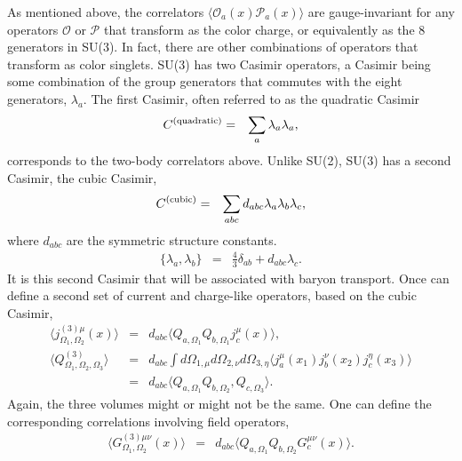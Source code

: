 \documentclass[aps, prc, 12pt, nofootinbib, showpacs, superscriptaddress, tightenlines, groupedaddress]{revtex4-2}
\begin{document}
As mentioned above, the correlators $\langle\mathcal{O}_a(x)\mathcal{P}_a(x)\rangle$ are gauge-invariant for any operators $\mathcal{O}$ or $\mathcal{P}$ that transform as the color charge, or equivalently as the 8 generators in SU(3). In fact, there are other combinations of operators that transform as color singlets. SU(3) has two Casimir operators, a Casimir being some combination of the group generators that commutes with the eight generators, $\lambda_a$. The first Casimir, often referred to as the quadratic Casimir
\begin{eqnarray}
C^{\rm(quadratic)}&=&\sum_a\lambda_a\lambda_a,
\end{eqnarray}
corresponds to the two-body correlators above. Unlike SU(2), SU(3) has a second Casimir, the cubic Casimir,
\begin{eqnarray}
C^{\rm(cubic)}&=&\sum_{abc}d_{abc}\lambda_a\lambda_b\lambda_c,
\end{eqnarray}
where $d_{abc}$ are the symmetric structure constants.
\begin{eqnarray}
\{\lambda_a,\lambda_b\}&=&\frac{4}{3}\delta_{ab}+d_{abc}\lambda_c.
\end{eqnarray}
It is this second Casimir that will be associated with baryon transport. Once can define a second set of current and charge-like operators, based on the cubic Casimir,
\begin{eqnarray}
\langle j^{(3)\mu}_{\Omega_1,\Omega_2}(x)\rangle &=&d_{abc}\langle Q_{a,\Omega_1}Q_{b,\Omega_1}j^\mu_c(x)\rangle,\\
\nonumber
\langle Q^{(3)}_{\Omega_1,\Omega_2,\Omega_3}\rangle&=&d_{abc}\int d\Omega_{1,\mu}d\Omega_{2,\nu}d\Omega_{3,\eta}\langle j^\mu_a(x_1) j^\nu_b(x_2)j^\eta_c(x_3)\rangle\\
\nonumber
&=&d_{abc}\langle Q_{a,\Omega_1}Q_{b,\Omega_2},Q_{c,\Omega_3}\rangle.
\end{eqnarray}
Again, the three volumes might or might not be the same. One can define the corresponding correlations involving field operators,
\begin{eqnarray}
\langle G^{(3)\mu\nu}_{\Omega_1,\Omega_2}(x)\rangle&=&d_{abc}\langle Q_{a,\Omega_1}Q_{b,\Omega_2}
G^{\mu\nu}_c(x)\rangle.
\end{eqnarray}
\end{document}
